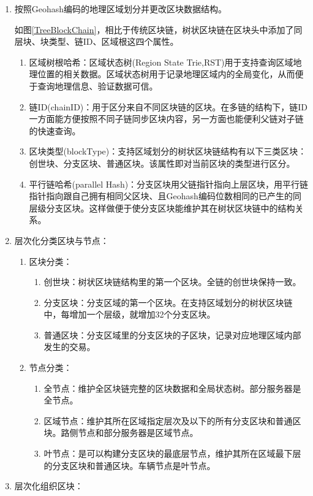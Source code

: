 \begin{enumerate}
    \item 按照Geohash编码的地理区域划分并更改区块数据结构。
    
    如图\ref{TreeBlockChain}，相比于传统区块链，树状区块链在区块头中添加了同层块、块类型、链ID、区域根这四个属性。
    \begin{enumerate}
        \item 区域树根哈希：区域状态树(Region State Trie,RST)用于支持查询区域地理位置的相关数据。区域状态树用于记录地理区域内的全局变化，从而便于查询地理信息、验证数据可信。
        \item 链ID(chainID)：用于区分来自不同区块链的区块。在多链的结构下，链ID一方面能方便按照不同子链同步区块内容，另一方面也能便利父链对子链的快速查询。
        \item 区块类型(blockType)：支持区域划分的树状区块链结构有以下三类区块：创世块、分支区块、普通区块。该属性即对当前区块的类型进行区分。
        \item 平行链哈希(parallel Hash)：分支区块用父链指针指向上层区块，用平行链指针指向跟自己拥有相同父区块、且Geohash编码位数相同的已产生的同层级分支区块。这样做便于使分支区块能维护其在树状区块链中的结构关系。
    \end{enumerate}
    \item 层次化分类区块与节点：
    \begin{enumerate}
        \item 区块分类：
        \begin{enumerate}
            \item 创世块：树状区块链结构里的第一个区块。全链的创世块保持一致。
            \item 分支区块：分支区域的第一个区块。在支持区域划分的树状区块链中，每增加一个层级，就增加32个分支区块。
            \item 普通区块：分支区域里的分支区块的子区块，记录对应地理区域内部发生的交易。
        \end{enumerate}
        \item 节点分类：
        \begin{enumerate}
            \item 全节点：维护全区块链完整的区块数据和全局状态树。部分服务器是全节点。
            \item 区域节点：维护其所在区域指定层次及以下的所有分支区块和普通区块。路侧节点和部分服务器是区域节点。
            \item 叶节点：是可以构建分支区块的最底层节点，维护其所在区域最下层的分支区块和普通区块。车辆节点是叶节点。
        \end{enumerate}
    \end{enumerate}
    \item 层次化组织区块：
    

\end{enumerate}
